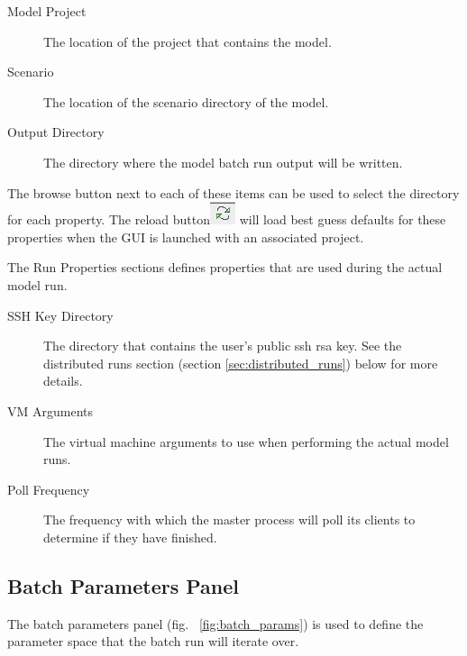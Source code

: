 \documentclass[11pt]{amsart}
\begin{document}
\begin{description}
\item[Model Project] The location of the project that contains the model. 
\item[Scenario] The location of the scenario directory of the model. 
\item[Output Directory] The directory where the model batch run output will be written.
\end{description}

The browse button next to each of these items can be used to select the directory for each property. The reload button\includegraphics[height=.2in]{images/reload_button.png}  will load best guess defaults for these properties when the GUI is launched with an associated project.

The Run Properties sections defines properties that are used during the actual model run. 

\begin{description}
\item[SSH Key Directory] The directory that contains the user's public ssh rsa key. See the distributed runs section (section \ref{sec:distributed_runs}) below for more details.
\item[VM Arguments] The virtual machine arguments to use when performing the actual model runs.
\item[Poll Frequency] The frequency with which the master process will poll its clients to determine if they have finished.\end{description}

\subsection{Batch Parameters Panel}
The batch parameters panel (fig. ~\ref{fig:batch_params})  is used to define the parameter space that the batch run will iterate over. 
\end{document}
